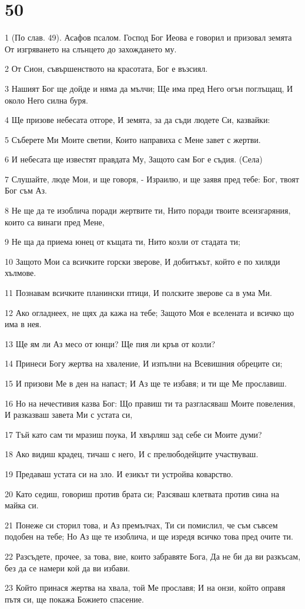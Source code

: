 \chapter{50}

\par 1 (По слав. 49). Асафов псалом. Господ Бог Иеова е говорил и призовал земята От изгряването на слънцето до захождането му.
\par 2 От Сион, съвършенството на красотата, Бог е възсиял.
\par 3 Нашият Бог ще дойде и няма да мълчи; Ще има пред Него огън поглъщащ, И около Него силна буря.
\par 4 Ще призове небесата отгоре, И земята, за да съди людете Си, казвайки:
\par 5 Съберете Ми Моите светии, Които направиха с Мене завет с жертви.
\par 6 И небесата ще известят правдата Му, Защото сам Бог е съдия. (Села)
\par 7 Слушайте, люде Мои, и ще говоря, - Израилю, и ще заявя пред тебе: Бог, твоят Бог съм Аз.
\par 8 Не ще да те изоблича поради жертвите ти, Нито поради твоите всеизгаряния, които са винаги пред Мене,
\par 9 Не ща да приема юнец от къщата ти, Нито козли от стадата ти;
\par 10 Защото Мои са всичките горски зверове, И добитъкът, който е по хиляди хълмове.
\par 11 Познавам всичките планински птици, И полските зверове са в ума Ми.
\par 12 Ако огладнеех, не щях да кажа на тебе; Защото Моя е вселената и всичко що има в нея.
\par 13 Ще ям ли Аз месо от юнци? Ще пия ли кръв от козли?
\par 14 Принеси Богу жертва на хваление, И изпълни на Всевишния обреците си;
\par 15 И призови Ме в ден на напаст; И Аз ще те избавя; и ти ще Ме прославиш.
\par 16 Но на нечестивия казва Бог: Що правиш ти та разгласяваш Моите повеления, И разказваш завета Ми с устата си,
\par 17 Тъй като сам ти мразиш поука, И хвърляш зад себе си Моите думи?
\par 18 Ако видиш крадец, тичаш с него, И с прелюбодейците участвуваш.
\par 19 Предаваш устата си на зло. И езикът ти устройва коварство.
\par 20 Като седиш, говориш против брата си; Разсяваш клетвата против сина на майка си.
\par 21 Понеже си сторил това, и Аз премълчах, Ти си помислил, че съм съвсем подобен на тебе; Но Аз ще те изоблича, и ще изредя всичко това пред очите ти.
\par 22 Разсъдете, прочее, за това, вие, които забравяте Бога, Да не би да ви разкъсам, без да се намери кой да ви избави.
\par 23 Който принася жертва на хвала, той Ме прославя; И на онзи, който оправя пътя си, ще покажа Божието спасение.

